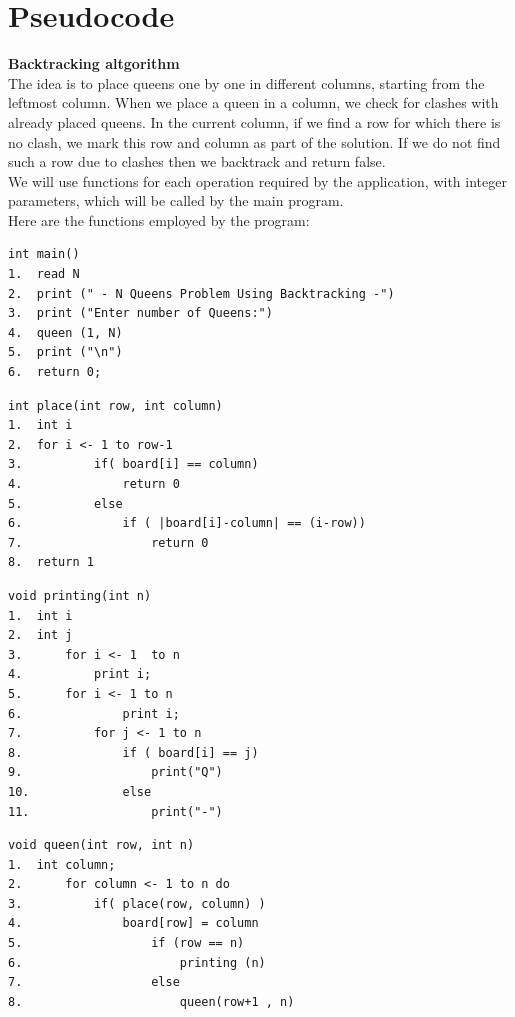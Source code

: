 \documentclass[14pt]{article}
\begin{document}
\section*{Pseudocode}
\textbf{Backtracking altgorithm}
\\
The idea is to place queens one by one in different columns, starting from the leftmost column. When we place a queen in a column, we check for clashes with already placed queens. In the current column, if we find a row for which there is no clash, we mark this row and column as part of the solution. If we do not find such a row due to clashes then we backtrack and return false.
\\
We will use functions for each operation required by the application, with integer parameters, which will be called by the main program.
\\
Here are the functions employed by the program:
\begin{lstlisting}
int main()
1.  read N
2.  print (" - N Queens Problem Using Backtracking -")
3.  print ("Enter number of Queens:")
4.	queen (1, N)
5.	print ("\n")
6.	return 0;
\end{lstlisting}
\begin{lstlisting}
int place(int row, int column)
1.	int i
2.	for i <- 1 to row-1
3.          if( board[i] == column)
4.	            return 0
5.          else
6.		        if ( |board[i]-column| == (i-row))
7.		            return 0
8.	return 1
\end{lstlisting}
\begin{lstlisting}
void printing(int n)
1.	int i
2.	int j
3.		for i <- 1  to n
4.			print i;
5.	    for i <- 1 to n
6.              print i;
7.          for j <- 1 to n
8.              if ( board[i] == j)
9.                  print("Q")
10.             else
11.                 print("-")
\end{lstlisting}
\begin{lstlisting}
void queen(int row, int n)
1.  int column;
2.		for column <- 1 to n do
3.          if( place(row, column) )
4.				board[row] = column
5.                  if (row == n)
6.                      printing (n)
7.                  else
8.                      queen(row+1 , n)
\end{lstlisting}



\newpage
\end{document}
